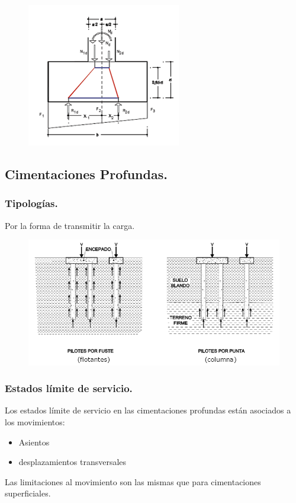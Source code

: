 \begin{figure}[H]
    \centering
    \includegraphics[width = 0.75 \linewidth]{Imagenes/Capacidad estructural del cimiento.png}
\end{figure}


\subsection{Cimentaciones Profundas.}

\subsubsection{Tipologías.}
Por la forma de transmitir la carga.

\begin{figure}[H]
    \centering
    \includegraphics[width = 1 \linewidth]{Imagenes/Cimentaciones profundas - Tipologias.png}
\end{figure}

\subsubsection{Estados límite de servicio.}
Los estados límite de servicio en las cimentaciones profundas están asociados a los movimientos:
\begin{itemize}
    \item Asientos
    \item desplazamientos transversales
\end{itemize}
Las limitaciones al movimiento son las mismas que para cimentaciones superficiales.

